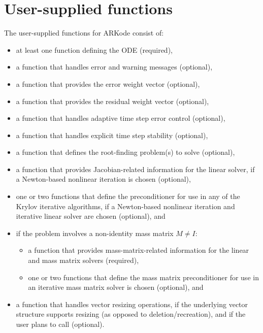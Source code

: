 \documentclass[letterpaper,10pt,english]{sphinxmanual}
\begin{document}
\section{User-supplied functions}
\label{c_interface/User_supplied:cinterface-usersupplied}\label{c_interface/User_supplied:user-supplied-functions}\label{c_interface/User_supplied::doc}
The user-supplied functions for ARKode consist of:
\begin{itemize}
\item {} 
at least one function defining the ODE (required),

\item {} 
a function that handles error and warning messages (optional),

\item {} 
a function that provides the error weight vector (optional),

\item {} 
a function that provides the residual weight vector (optional),

\item {} 
a function that handles adaptive time step error control (optional),

\item {} 
a function that handles explicit time step stability (optional),

\item {} 
a function that defines the root-finding problem(s) to solve
(optional),

\item {} 
a function that provides Jacobian-related information for the linear
solver, if a Newton-based nonlinear iteration is chosen (optional),

\item {} 
one or two functions that define the preconditioner for use in any
of the Krylov iterative algorithms, if a Newton-based nonlinear
iteration and iterative linear solver are chosen (optional), and

\item {} 
if the problem involves a non-identity mass matrix \(M\ne I\):
\begin{itemize}
\item {} 
a function that provides mass-matrix-related information for the
linear and mass matrix solvers (required),

\item {} 
one or two functions that define the mass matrix preconditioner
for use in an iterative mass matrix solver is chosen (optional), and

\end{itemize}

\item {} 
a function that handles vector resizing operations, if the
underlying vector structure supports resizing (as opposed to
deletion/recreation), and if the user plans to call
{\hyperref[c_interface/User_callable:c.ARKodeResize]{\emph{}}} (optional).

\end{itemize}
\end{document}
